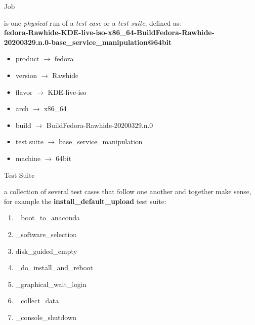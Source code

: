 \documentclass[12pt,aspectratio=169]{beamer}
\begin{document}
\begin{frame}[fragile]{Job}

is one \textit{physical} run of a \textit{test case} or a \textit{test suite}, defined as: \\
\textbf{{\tiny fedora-Rawhide-KDE-live-iso-x86\_64-BuildFedora-Rawhide-20200329.n.0-base\_service\_manipulation@64bit}}
 \vspace{5pt}
	
	\begin{itemize}
		\item product $\longrightarrow$ fedora
		\item version $\longrightarrow$ Rawhide
		\item flavor $\longrightarrow$ KDE-live-iso
		\item arch $\longrightarrow$ x86\_64
		\item build $\longrightarrow$ BuildFedora-Rawhide-20200329.n.0
		\item test suite $\longrightarrow$ base\_service\_manipulation
		\item machine $\longrightarrow$ 64bit
	\end{itemize}
\end{frame}

\begin{frame}[fragile]{Test Suite}

	a collection of several test cases that follow one another and together make sense, for example the \textbf{install\_default\_upload} test suite:	

	\vspace{5pt}
	
	\begin{enumerate}
		\item  \_boot\_to\_anaconda
		\item \_software\_selection
		\item disk\_guided\_empty
		\item \_do\_install\_and\_reboot
		\item \_graphical\_wait\_login
		\item \_collect\_data
		\item \_console\_shutdown
	\end{enumerate}
\end{frame}
\end{document}
